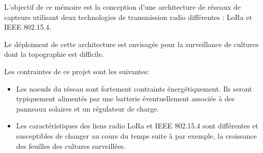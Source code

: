 L’objectif de ce mémoire est la conception d’une architecture de réseaux de capteurs utilisant deux
technologies de transmission radio différentes : LoRa et IEEE 802.15.4.

Le déploiment de cette architecture est envisagée pour la surveillance de cultures dont la topographie
est difficile.

Les contraintes de ce projet sont les suivantes:
\begin{itemize}
    \item Les noeuds du réseau sont fortement contraints énergétiquement. Ils seront typiquement alimentés
    par une batterie éventuellement associée à des panneaux solaires et un régulateur de charge.
    \item Les caractéristiques des liens radio LoRa et IEEE 802.15.4 sont différentes et susceptibles
    de changer au cours du temps suite à par exemple, la croissance des feuilles des cultures surveillées.
\end{itemize}